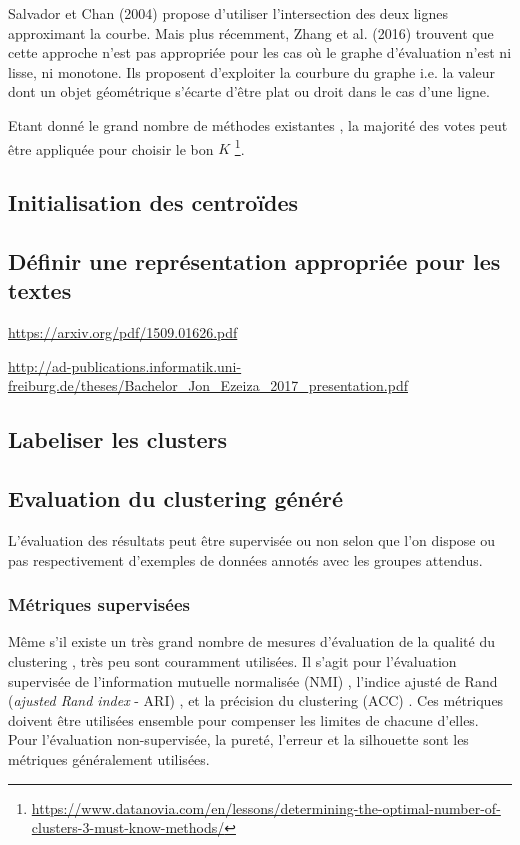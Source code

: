 Salvador et Chan (2004) propose d’utiliser l’intersection des deux lignes approximant la courbe. Mais plus récemment, Zhang et al. (2016) trouvent que cette approche n’est pas appropriée pour les cas où le graphe d’évaluation n’est ni lisse, ni monotone. Ils proposent d’exploiter la courbure du graphe i.e. la valeur dont un objet géométrique s'écarte d'être plat ou droit dans le cas d'une ligne.

Etant donné le grand nombre de méthodes existantes \citep{liu2010interclustvalidation, Amorim2015recoveringnumclust}, la majorité des votes peut être appliquée pour choisir le bon $K$ \footnote{\url{https://www.datanovia.com/en/lessons/determining-the-optimal-number-of-clusters-3-must-know-methods/}}.

\subsection{Initialisation des centroïdes}

\subsection{Définir une représentation appropriée pour les textes}
\url{https://arxiv.org/pdf/1509.01626.pdf}

\url{http://ad-publications.informatik.uni-freiburg.de/theses/Bachelor_Jon_Ezeiza_2017_presentation.pdf}


\subsection{Labeliser les clusters}

\subsection{Evaluation du clustering généré}
L'évaluation des résultats peut être supervisée ou non selon que l'on dispose ou pas respectivement d'exemples de données annotés avec les groupes attendus.

\subsubsection{Métriques supervisées}
\label{sec:similarite:biblio:supeval}
Même s'il existe un très grand nombre de mesures d'évaluation de la qualité du clustering \citep{im2003clusteringsurvey}, très peu sont couramment utilisées. Il s'agit pour l'évaluation supervisée de l'information mutuelle normalisée (NMI) \citep{}, l'indice ajusté de Rand (\textit{ajusted Rand index} - ARI) \citep{}, et la précision du clustering (ACC) \citep{}. Ces métriques doivent être utilisées ensemble \cite{yang2017kmeansfriendlyspaces} pour compenser les limites de chacune d'elles. Pour l'évaluation non-supervisée, la pureté, l'erreur et la silhouette sont les métriques généralement utilisées.

